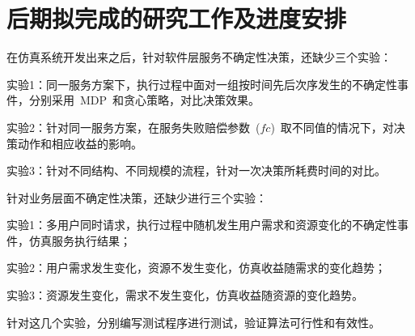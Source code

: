 \section{后期拟完成的研究工作及进度安排}

在仿真系统开发出来之后，针对软件层服务不确定性决策，还缺少三个实验：

实验1：同一服务方案下，执行过程中面对一组按时间先后次序发生的不确定性事件，分别采用~MDP~和贪心策略，对比决策效果。

实验2：针对同一服务方案，在服务失败赔偿参数~($fc$)~取不同值的情况下，对决策动作和相应收益的影响。

实验3：针对不同结构、不同规模的流程，针对一次决策所耗费时间的对比。

针对业务层面不确定性决策，还缺少进行三个实验：

实验1：多用户同时请求，执行过程中随机发生用户需求和资源变化的不确定性事件，仿真服务执行结果；

实验2：用户需求发生变化，资源不发生变化，仿真收益随需求的变化趋势；

实验3：资源发生变化，需求不发生变化，仿真收益随资源的变化趋势。

针对这几个实验，分别编写测试程序进行测试，验证算法可行性和有效性。